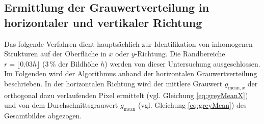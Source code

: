 \documentclass{article}
\begin{document}
\subsection{Ermittlung der Grauwertverteilung in horizontaler und vertikaler Richtung}

Das folgende Verfahren dient hauptsächlich zur Identifikation von inhomogenen Strukturen auf der Oberfläche in $x$ oder $y$-Richtung. 
Die Randbereiche $r = \lfloor 0.03 h \rfloor$ (3\,\% der Bildhöhe $h$) werden von dieser Untersuchung ausgeschlossen.
Im Folgenden wird der Algorithmus anhand der horizontalen Grauwertverteilung beschrieben.
In der horizontalen Richtung wird der mittlere Grauwert $g_{\text{mean}, x}$ der orthogonal dazu verlaufenden Pixel ermittelt (vgl. Gleichung \ref{eq:greyMeanX}) und von dem Durchschnittsgrauwert $g_\text{mean}$ (vgl. Gleichung \ref{eq:greyMean}) des Gesamtbildes abgezogen.
\end{document}
